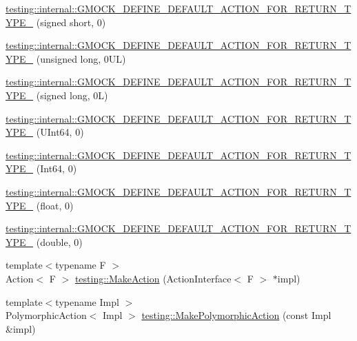 \begin{DoxyCompactItemize}
\item 
\hyperlink{namespacetesting_1_1internal_ae6ea5db83b290e2412f321c3b1eb8c47}{testing\+::internal\+::\+G\+M\+O\+C\+K\+\_\+\+D\+E\+F\+I\+N\+E\+\_\+\+D\+E\+F\+A\+U\+L\+T\+\_\+\+A\+C\+T\+I\+O\+N\+\_\+\+F\+O\+R\+\_\+\+R\+E\+T\+U\+R\+N\+\_\+\+T\+Y\+P\+E\+\_\+} (signed short, 0)
\item 
\hyperlink{namespacetesting_1_1internal_a1f4167b954a7ff0074ce8a5bb855f86f}{testing\+::internal\+::\+G\+M\+O\+C\+K\+\_\+\+D\+E\+F\+I\+N\+E\+\_\+\+D\+E\+F\+A\+U\+L\+T\+\_\+\+A\+C\+T\+I\+O\+N\+\_\+\+F\+O\+R\+\_\+\+R\+E\+T\+U\+R\+N\+\_\+\+T\+Y\+P\+E\+\_\+} (unsigned long, 0\+U\+L)
\item 
\hyperlink{namespacetesting_1_1internal_ad8804e25537427755c324ab03a72e776}{testing\+::internal\+::\+G\+M\+O\+C\+K\+\_\+\+D\+E\+F\+I\+N\+E\+\_\+\+D\+E\+F\+A\+U\+L\+T\+\_\+\+A\+C\+T\+I\+O\+N\+\_\+\+F\+O\+R\+\_\+\+R\+E\+T\+U\+R\+N\+\_\+\+T\+Y\+P\+E\+\_\+} (signed long, 0\+L)
\item 
\hyperlink{namespacetesting_1_1internal_ad2efcdbd12c7c020745b87bcc0997809}{testing\+::internal\+::\+G\+M\+O\+C\+K\+\_\+\+D\+E\+F\+I\+N\+E\+\_\+\+D\+E\+F\+A\+U\+L\+T\+\_\+\+A\+C\+T\+I\+O\+N\+\_\+\+F\+O\+R\+\_\+\+R\+E\+T\+U\+R\+N\+\_\+\+T\+Y\+P\+E\+\_\+} (U\+Int64, 0)
\item 
\hyperlink{namespacetesting_1_1internal_ab427739121a380a7934bda96153f053d}{testing\+::internal\+::\+G\+M\+O\+C\+K\+\_\+\+D\+E\+F\+I\+N\+E\+\_\+\+D\+E\+F\+A\+U\+L\+T\+\_\+\+A\+C\+T\+I\+O\+N\+\_\+\+F\+O\+R\+\_\+\+R\+E\+T\+U\+R\+N\+\_\+\+T\+Y\+P\+E\+\_\+} (Int64, 0)
\item 
\hyperlink{namespacetesting_1_1internal_a71c697e5b567365fd3ff6c720769633b}{testing\+::internal\+::\+G\+M\+O\+C\+K\+\_\+\+D\+E\+F\+I\+N\+E\+\_\+\+D\+E\+F\+A\+U\+L\+T\+\_\+\+A\+C\+T\+I\+O\+N\+\_\+\+F\+O\+R\+\_\+\+R\+E\+T\+U\+R\+N\+\_\+\+T\+Y\+P\+E\+\_\+} (float, 0)
\item 
\hyperlink{namespacetesting_1_1internal_a7ba92aa33f4968c902623cd02e445020}{testing\+::internal\+::\+G\+M\+O\+C\+K\+\_\+\+D\+E\+F\+I\+N\+E\+\_\+\+D\+E\+F\+A\+U\+L\+T\+\_\+\+A\+C\+T\+I\+O\+N\+\_\+\+F\+O\+R\+\_\+\+R\+E\+T\+U\+R\+N\+\_\+\+T\+Y\+P\+E\+\_\+} (double, 0)
\item 
{\footnotesize template$<$typename F $>$ }\\Action$<$ F $>$ \hyperlink{namespacetesting_ae6b9960db2b2685e043ce5215291f5b8}{testing\+::\+Make\+Action} (Action\+Interface$<$ F $>$ $\ast$impl)
\item 
{\footnotesize template$<$typename Impl $>$ }\\Polymorphic\+Action$<$ Impl $>$ \hyperlink{namespacetesting_a36bd06c5ea972c6df0bd9f40a7a94c65}{testing\+::\+Make\+Polymorphic\+Action} (const Impl \&impl)

\end{DoxyCompactItemize}
